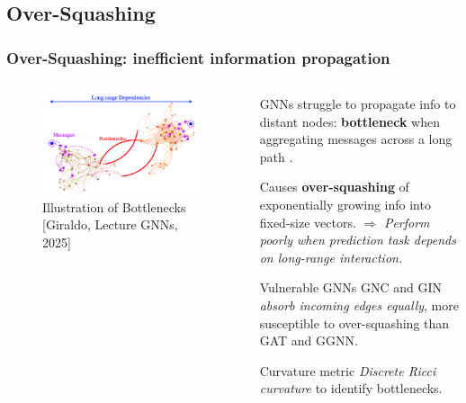 \documentclass[10pt, aspectratio = 169]{beamer}
\begin{document}
\subsection{Over-Squashing}
\begin{frame}
    \frametitle{Over-Squashing: inefficient information propagation}
    
    \begin{columns}
        \begin{column}{0.4\textwidth}
            \begin{figure}
                \includegraphics[width=0.99\textwidth]{figures/over_squashing_Girarldo.png}
                \caption{Illustration of Bottlenecks [Giraldo, Lecture GNNs, 2025]}
            \end{figure}

        \end{column}    
        \begin{column}{0.6\textwidth}
            GNNs struggle to propagate info to distant nodes: \textbf{bottleneck} 
            when aggregating messages across a long path \cite[Alon et al., 2021]{alon2021bottleneckgraphneuralnetworks}.
            
            Causes \textbf{over-squashing} of exponentially growing info into fixed-size vectors.
            $\Rightarrow$ \emph{Perform poorly when prediction task depends on long-range interaction.}

            \begin{block}{Vulnerable GNNs}
                GNC and GIN \emph{absorb incoming edges equally}, more susceptible to over-squashing than GAT and GGNN.
            \end{block}
            \begin{block}{Curvature metric}
                \emph{Discrete Ricci curvature} \cite[Topping et al. 2021]{topping2022understandingoversquashingbottlenecksgraphs} to identify bottlenecks.
            \end{block}
        \end{column}
    \end{columns}
\end{frame}
\end{document}
